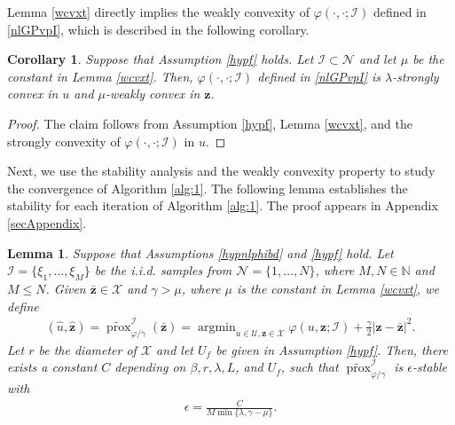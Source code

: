 \documentclass[10pt,reqno]{amsart}
\newcommand{\argmin}{\operatorname{argmin}}
\newcommand{\1}{{\chi}}
\def\leq{\leqslant}
\numberwithin{equation}{section}
\theoremstyle{thmlemcorr}
\numberwithin{theorem}{section}
\newtheorem{lemma}[theorem]{Lemma}
\newtheorem{corollary}[theorem]{Corollary}
\theoremstyle{thmlemcorr*}
\theoremstyle{defi}
\theoremstyle{remexample}
\theoremstyle{ass}
\begin{document}
Lemma \ref{wcvxt} directly implies the weakly convexity of $\varphi(\cdot, \cdot; \mathcal{I})$ defined in \eqref{nlGPvpI}, which is described in the following corollary. 
\begin{corollary}
	\label{corovarphicv}
	Suppose that Assumption \ref{hypf} holds. Let $\mathcal{I}\subset \mathcal{N}$ and let $\mu$ be the constant in Lemma \ref{wcvxt}. Then, $\varphi(\cdot, \cdot; \mathcal{I})$ defined in \eqref{nlGPvpI} is $\lambda$-strongly convex in $u$ and $\mu$-weakly convex in $\boldsymbol{z}$. 
\end{corollary}
\begin{proof}
	The claim follows from Assumption \ref{hypf}, Lemma \ref{wcvxt}, and the strongly convexity of $\varphi(\cdot, \cdot;\mathcal{I})$ in $u$.  
\end{proof}

Next, we use the stability analysis and the weakly convexity property to study the convergence of Algorithm \ref{alg:1}. The following lemma establishes the stability for each iteration of Algorithm \ref{alg:1}.
The proof appears in Appendix \ref{secAppendix}. 

\begin{lemma}
	\label{nlstles}
	Suppose that Assumptions \ref{hypnlphibd} and \ref{hypf} hold. Let $\mathcal{I} = \{\xi_1, \dots, \xi_{M}\}$ be the i.i.d. samples from $\mathcal{N}=\{1, \dots, N\}$, where $M, N \in \mathbb{N}$ and $M \leq N$. Given $\bar{\boldsymbol{z}}\in \mathcal{X}$ and $\gamma>\mu$, where $\mu$ is the constant in Lemma \ref{wcvxt}, we define
	\begin{align} 
		\label{uhzhmn}
		(\hat{u}, \hat{\boldsymbol{z}})=\widetilde{\operatorname{prox}}_{\varphi/\gamma}^{\mathcal{I}}(\bar{\boldsymbol{z}})=\argmin_{u\in \mathcal{U}, \boldsymbol{z}\in \mathcal{X}}\varphi(u, \boldsymbol{z}; {\mathcal{I}}) + \frac{\gamma}{2}|\boldsymbol{z} - \bar{\boldsymbol{z}}|^2.
	\end{align}
	Let $r$ be the diameter of $\mathcal{X}$ and let $U_f$ be given in Assumption \ref{hypf}. Then, there exists a constant $C$ depending on $\beta, r, \lambda, L$, and $U_f$,  such that  $\widetilde{\operatorname{prox}}_{\varphi/\gamma}^{\mathcal{I}}$ is $\epsilon$-stable with 
	\begin{align}
		\label{nonepsdef}
		\epsilon = \frac{C}{M\min\{\lambda, \gamma-\mu\}}.
	\end{align}
\end{lemma}
\end{document}
